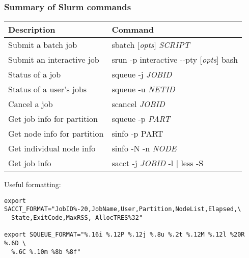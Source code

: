 \documentclass[10pt]{beamer}
\newcommand\smallfont{\fontsize{8pt}{7.2}\selectfont}
\begin{document}
\begin{frame}[fragile]
\frametitle{Summary of Slurm commands}
\begin{tabular}{|l|l|}
\hline
\textbf{Description} & \textbf{Command} \\
\hline
Submit a batch job & sbatch [\textit{opts}] \textit{SCRIPT} \\
\hline
Submit an interactive job & srun -p interactive -{}-pty [\textit{opts}] bash  \\
\hline
Status of a job & squeue -j \textit{JOBID} \\
\hline
Status of a user's jobs & squeue -u \textit{NETID} \\
\hline
Cancel a job & scancel \textit{JOBID} \\
\hline
Get job info for partition & squeue -p \textit{PART} \\
\hline
Get node info for partition & sinfo -p {PART} \\
\hline
Get individual node info & sinfo -N -n \textit{NODE} \\
\hline
Get job info & sacct -j \textit{JOBID} -l | less -S \\
\hline
\end{tabular}

\vspace{0.1in}
Useful formatting:
\smallfont
\begin{verbatim}
export SACCT_FORMAT="JobID%-20,JobName,User,Partition,NodeList,Elapsed,\
  State,ExitCode,MaxRSS, AllocTRES%32"

export SQUEUE_FORMAT="%.16i %.12P %.12j %.8u %.2t %.12M %.12l %20R %.6D \
  %.6C %.10m %8b %8f"
\end{verbatim}

\end{frame}
\end{document}
